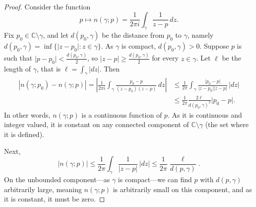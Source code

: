 \documentclass[12pt,openany]{book}
\newcommand{\sabs}[1]{\lvert {#1} \rvert}
\newcommand{\abs}[1]{\left\lvert {#1} \right\rvert}
\newcommand{\C}{{\mathbb{C}}}
\theoremstyle{plain}
\theoremstyle{remark}
\theoremstyle{definition}
\theoremstyle{exercise}
\theoremstyle{example}
\begin{document}
\begin{proof}
Consider the function
\begin{equation*}
p \mapsto n(\gamma;p) = \frac{1}{2\pi i} \int_\gamma \frac{1}{z-p} \, dz .
\end{equation*}
Fix $p_0 \in \C \setminus \gamma$, and let $d(p_0,\gamma)$ be the distance from 
$p_0$ to $\gamma$, namely
$d(p_0,\gamma) = \inf \bigl\{ \sabs{z-p_0} : z \in \gamma \bigr\}$.
As $\gamma$ is compact, $d(p_0,\gamma) > 0$.  Suppose $p$ is
such that $\sabs{p-p_0} < \frac{d(p_0,\gamma)}{2}$, so $\sabs{z-p} \geq
\frac{d(p_0,\gamma)}{2}$ for every $z \in \gamma$.  Let $\ell$ be the length of
$\gamma$, that is $\ell = \int_\gamma \sabs{dz}$.  Then
\begin{equation*}
\begin{split}
\abs{n(\gamma;p_0)-n(\gamma;p)}
=
\abs{\frac{1}{2\pi i} \int_\gamma \frac{p_0-p}{(z-p_0)(z-p)} \, dz}
& \leq
\frac{1}{2\pi} \int_\gamma \frac{\sabs{p_0-p}}{\sabs{z-p_0}\sabs{z-p}} \, \sabs{dz}
\\
& \leq 
\frac{1}{2\pi} \frac{2\ell}{{d(p_0,\gamma)}^2} \sabs{p_0-p} .
\end{split}
\end{equation*}
In other words, $n(\gamma;p)$ is a continuous function of $p$.
As it is continuous
and integer valued, it is constant on any connected component of
$\C \setminus \gamma$ (the set where it is defined).

Next,
\begin{equation*}
\sabs{n(\gamma;p)} \leq \frac{1}{2\pi} \int_\gamma \frac{1}{\sabs{z-p}} \,
\sabs{dz} \leq \frac{1}{2\pi} \frac{\ell}{d(p,\gamma)} .
\end{equation*}
On the unbounded component---as $\gamma$ is compact---we can find $p$
with $d(p,\gamma)$ arbitrarily large, meaning $n(\gamma;p)$ is arbitrarily small
on this component, and as it is constant, it must be zero.
\end{proof}
\end{document}
